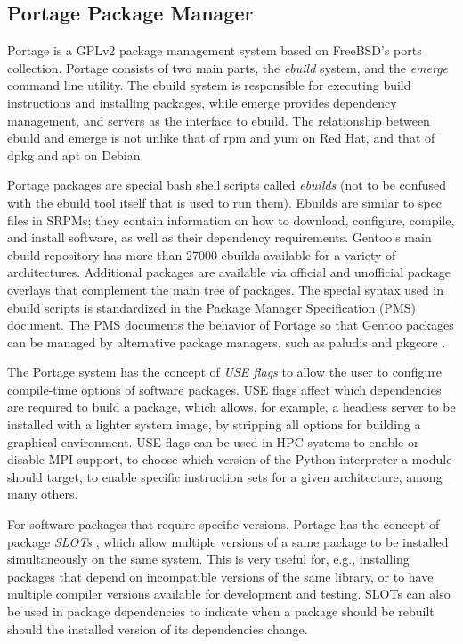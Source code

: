 \documentclass[a4paper,conference]{IEEEtran}
\begin{document}
\subsection{Portage Package Manager}
\label{sec:ebuild}

Portage is a GPLv2 package management system based on FreeBSD's ports
collection. Portage consists of two main parts, the \emph{ebuild}
system, and the \emph{emerge} command line utility. The ebuild system is
responsible for executing build instructions and installing packages,
while emerge provides dependency management, and servers as the
interface to ebuild. The relationship between ebuild and emerge is not
unlike that of rpm and yum on Red Hat, and that of dpkg and apt on
Debian.

Portage packages are special bash shell scripts called \emph{ebuilds}
(not to be confused with the ebuild tool itself that is used to run
them). Ebuilds are similar to spec files in SRPMs; they contain
information on how to download, configure, compile, and install
software, as well as their dependency requirements. Gentoo's main ebuild
repository has more than 27000 ebuilds available for a variety of
architectures. Additional packages are available via official and
unofficial package overlays that complement the main tree of packages.
The special syntax used in ebuild scripts is standardized in the Package
Manager Specification (PMS) \cite{gentoo:pms} document. The PMS
documents the behavior of Portage so that Gentoo packages can be managed
by alternative package managers, such as paludis \cite{paludis} and pkgcore \cite{pkgcore}.

The Portage system has the concept of \emph{USE flags} to allow the user
to configure compile-time options of software packages. USE flags affect
which dependencies are required to build a package, which allows, for
example, a headless server to be installed with a lighter system image,
by stripping all options for building a graphical environment. USE flags
can be used in HPC systems to enable or disable MPI support, to choose
which version of the Python interpreter a module should target, to
enable specific instruction sets for a given architecture, among many
others.

For software packages that require specific versions, Portage has the
concept of package \emph{SLOTs} \cite[p.~27]{gentoo:pms}, which allow multiple versions of a same
package to be installed simultaneously on the same system. This is very
useful for, e.g., installing packages that depend on incompatible
versions of the same library, or to have multiple compiler versions
available for development and testing. SLOTs can also be used in package
dependencies to indicate when a package should be rebuilt should the
installed version of its dependencies change.
\end{document}
